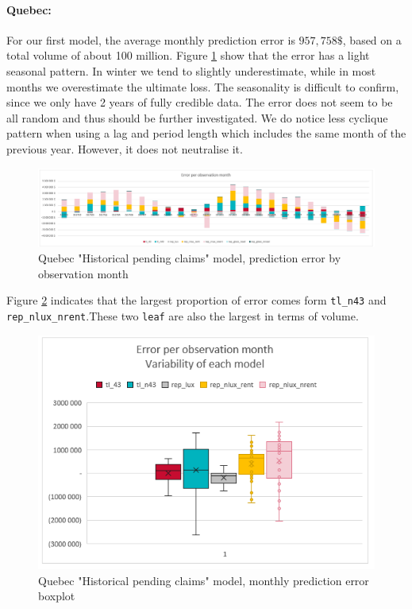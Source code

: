 	\paragraph{Quebec:}
		For our first model, the average monthly prediction error is $957,758 \$$, based on a total volume of about 100 million. Figure \ref{Fig_QC_current_er_by_month} show that the error has a light seasonal pattern. In winter we tend to slightly underestimate, while in most months we overestimate the ultimate loss. The seasonality is difficult to confirm, since we only have 2 years of fully credible data. The error does not seem to be all random and thus should be further investigated. We do notice less cyclique pattern when using a lag and period length which includes the same month of the previous year. However, it does not neutralise it.
		\begin{figure}[H]
			\begin{center}
				\includegraphics[scale=0.4]{Graphiques/QC_current_model_by_month} 
				\renewcommand{\figurename}{Figure}
				\caption{Quebec "Historical  pending claims" model, prediction error by observation month}\label{Fig_QC_current_er_by_month}
			\end{center}
		\end{figure}
		Figure \ref{Fig_QC_current_er_boxplot} indicates that the largest proportion of error comes form \texttt{tl\_n43} and \texttt{rep\_nlux\_nrent}.These two \texttt{leaf} are also the largest in terms of volume. 
		\begin{figure}[H]
			\begin{center}
				\includegraphics[scale=0.4]{Graphiques/QC_current_model_mustach} 
				\renewcommand{\figurename}{Figure}
				\caption{Quebec "Historical  pending claims" model, monthly prediction error boxplot}\label{Fig_QC_current_er_boxplot}
			\end{center}
		\end{figure}
	

